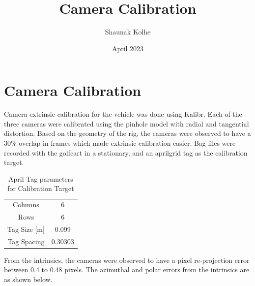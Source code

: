 \documentclass{article}
\title{Camera Calibration}
\author{Shaunak Kolhe}
\date{April 2023}
\begin{document}
\maketitle

\newpage

\section{Camera Calibration}

Camera extrinsic calibration for the vehicle was done using Kalibr. Each of the three cameras were calibrated using the pinhole model with radial and tangential distortion. Based on the geometry of the rig, the cameras were observed to have a 30\% overlap in frames which made extrinsic calibration easier.
Bag files were recorded with the golfcart in a stationary, and an aprilgrid tag as the calibration target.

\begin{table}[h]
    \centering
    \begin{tabular}{c|c}
        Columns & 6 \\
        Rows & 6 \\
        Tag Size [m] & 0.099 \\
        Tag Spacing & 0.30303
    \end{tabular}
    \caption{April Tag parameters for Calibration Target}
    \label{tab:my_label}
\end{table}

From the intrinsics, the cameras were observed to have a pixel re-projection error between 0.4 to 0.48 pixels. The azimuthal and polar errors from the intrinsics are as shown below.
\end{document}
